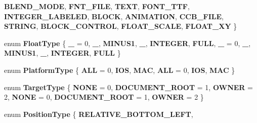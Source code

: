 \begin{DoxyCompactItemize}
{\bfseries B\+L\+E\+N\+D\+\_\+\+M\+O\+DE}, 
{\bfseries F\+N\+T\+\_\+\+F\+I\+LE}, 
{\bfseries T\+E\+XT}, 
{\bfseries F\+O\+N\+T\+\_\+\+T\+TF}, 
\newline
{\bfseries I\+N\+T\+E\+G\+E\+R\+\_\+\+L\+A\+B\+E\+L\+ED}, 
{\bfseries B\+L\+O\+CK}, 
{\bfseries A\+N\+I\+M\+A\+T\+I\+ON}, 
{\bfseries C\+C\+B\+\_\+\+F\+I\+LE}, 
\newline
{\bfseries S\+T\+R\+I\+NG}, 
{\bfseries B\+L\+O\+C\+K\+\_\+\+C\+O\+N\+T\+R\+OL}, 
{\bfseries F\+L\+O\+A\+T\+\_\+\+S\+C\+A\+LE}, 
{\bfseries F\+L\+O\+A\+T\+\_\+\+XY}
 \}
\item 
\mbox{\label{classcocosbuilder_1_1CCBReader_a57b6125313b85143f13b37ad9c129c6e}} 
enum {\bfseries Float\+Type} \{ \newline
{\bfseries \+\_} = 0, 
{\bfseries \+\_}, 
{\bfseries M\+I\+N\+U\+S1}, 
{\bfseries \+\_}, 
\newline
{\bfseries I\+N\+T\+E\+G\+ER}, 
{\bfseries F\+U\+LL}, 
{\bfseries \+\_} = 0, 
{\bfseries \+\_}, 
\newline
{\bfseries M\+I\+N\+U\+S1}, 
{\bfseries \+\_}, 
{\bfseries I\+N\+T\+E\+G\+ER}, 
{\bfseries F\+U\+LL}
 \}
\item 
\mbox{\label{classcocosbuilder_1_1CCBReader_a512fe38b200d3ed650bf0281ea3425ff}} 
enum {\bfseries Platform\+Type} \{ \newline
{\bfseries A\+LL} = 0, 
{\bfseries I\+OS}, 
{\bfseries M\+AC}, 
{\bfseries A\+LL} = 0, 
\newline
{\bfseries I\+OS}, 
{\bfseries M\+AC}
 \}
\item 
\mbox{\label{classcocosbuilder_1_1CCBReader_a0735867cae396dfa6ea8d1fbd1cf0da0}} 
enum {\bfseries Target\+Type} \{ \newline
{\bfseries N\+O\+NE} = 0, 
{\bfseries D\+O\+C\+U\+M\+E\+N\+T\+\_\+\+R\+O\+OT} = 1, 
{\bfseries O\+W\+N\+ER} = 2, 
{\bfseries N\+O\+NE} = 0, 
\newline
{\bfseries D\+O\+C\+U\+M\+E\+N\+T\+\_\+\+R\+O\+OT} = 1, 
{\bfseries O\+W\+N\+ER} = 2
 \}
\item 
\mbox{\label{classcocosbuilder_1_1CCBReader_a6ae9bd5d822cfb0d42615bda33766500}} 
enum {\bfseries Position\+Type} \{ \newline
{\bfseries R\+E\+L\+A\+T\+I\+V\+E\+\_\+\+B\+O\+T\+T\+O\+M\+\_\+\+L\+E\+FT}, 

\end{DoxyCompactItemize}
